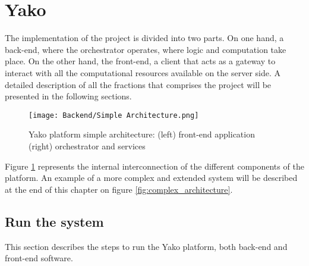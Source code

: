 \section{Yako} \label{yako}
     The implementation of the project is divided into two parts. On one hand, a back-end, where the orchestrator operates, where logic and computation take place. On the other hand, the front-end, a client that acts as a gateway to interact with all the computational resources available on the server side. A detailed description of all the fractions that comprises the project will be presented in the following sections.
    
    \begin{figure}[H]
        \centering
        \texttt{[image: Backend/Simple Architecture.png]}
        \caption{Yako platform simple architecture: (left) front-end application (right) orchestrator and services}
        \label{fig:simple_architecture}
    \end{figure}
    
    Figure \ref{fig:simple_architecture} represents the internal interconnection of the different components of the platform. An example of a more complex and extended system will be described at the end of this chapter on figure \ref{fig:complex_architecture}.
 
    
    
    
    \subsection{Run the system}
    
        This section describes the steps to run the Yako platform, both back-end and front-end software.
        
        
        